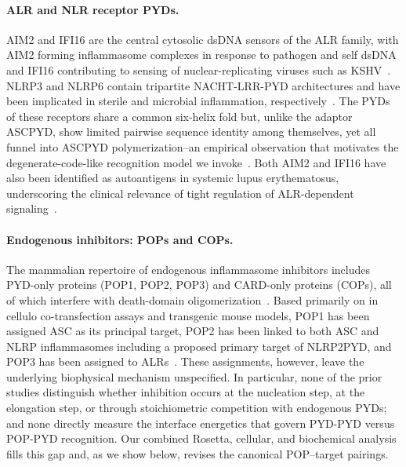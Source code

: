 \paragraph{ALR and NLR receptor PYDs.} AIM2 and IFI16 are the central cytosolic dsDNA sensors of the ALR family, with AIM2 forming inflammasome complexes in response to pathogen and self dsDNA and IFI16 contributing to sensing of nuclear-replicating viruses such as KSHV~\cite{hornung2009aim2,fernandesalnemri2009aim2,roberts2009hin200,kerur2011ifi16,morrone2015assembly}. NLRP3 and NLRP6 contain tripartite NACHT-LRR-PYD architectures and have been implicated in sterile and microbial inflammation, respectively~\cite{shen2019nlrp6,sharif2019nek7,andreeva2021nlrp3}. The PYDs of these receptors share a common six-helix fold but, unlike the adaptor ASCPYD, show limited pairwise sequence identity among themselves, yet all funnel into ASCPYD polymerization--an empirical observation that motivates the degenerate-code-like recognition model we invoke~\cite{matyszewski2021distinct,lu2014unified}. Both AIM2 and IFI16 have also been identified as autoantigens in systemic lupus erythematosus, underscoring the clinical relevance of tight regulation of ALR-dependent signaling~\cite{antiochos2022dna}.

\paragraph{Endogenous inhibitors: POPs and COPs.} The mammalian repertoire of endogenous inflammasome inhibitors includes PYD-only proteins (POP1, POP2, POP3) and CARD-only proteins (COPs), all of which interfere with death-domain oligomerization~\cite{indramohan2018cops}. Based primarily on in cellulo co-transfection assays and transgenic mouse models, POP1 has been assigned ASC as its principal target, POP2 has been linked to both ASC and NLRP inflammasomes including a proposed primary target of NLRP2PYD, and POP3 has been assigned to ALRs~\cite{dealmeida2015pyrin,periasamy2017pop2,ratsimandresy2017pop2,khare2014pop3}. These assignments, however, leave the underlying biophysical mechanism unspecified. In particular, none of the prior studies distinguish whether inhibition occurs at the nucleation step, at the elongation step, or through stoichiometric competition with endogenous PYDs; and none directly measure the interface energetics that govern PYD-PYD versus POP-PYD recognition. Our combined Rosetta, cellular, and biochemical analysis fills this gap and, as we show below, revises the canonical POP--target pairings.

